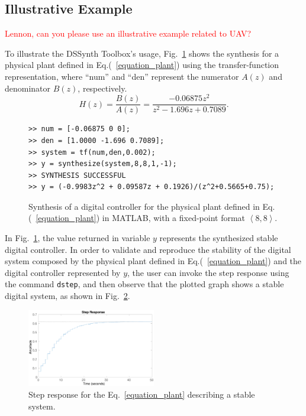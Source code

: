 \documentclass[sigconf]{acmart}
\newcommand\tool{{DSSynth Toolbox}\xspace}
\begin{document}
\subsection{Illustrative Example}

\textcolor{red}{Lennon, can you please use an illustrative example related to UAV?}

To illustrate the \tool's usage, Fig.~\ref{toolbox-usage} shows the 
synthesis for a physical plant defined in Eq.(~\ref{equation_plant}) 
using the transfer-function representation, where ``num'' and ``den'' 
represent the numerator $A(z)$ and denominator $B(z)$, respectively.
%
\begin{equation}
\label{equation_plant}
H(z)=\frac{B(z)}{A(z)}=\frac{-0.06875z^{2}}{z^2-1.696z+0.7089}.
\end{equation}
%
\begin{figure}[ht]
\scriptsize
\begin{lstlisting}[xleftmargin=.025\textwidth,xrightmargin=.025\textwidth, frame=single,]
>> num = [-0.06875 0 0];
>> den = [1.0000 -1.696 0.7089];
>> system = tf(num,den,0.002);
>> y = synthesize(system,8,8,1,-1);
>> SYNTHESIS SUCCESSFUL
>> y = (-0.9983z^2 + 0.09587z + 0.1926)/(z^2+0.5665+0.75);
\end{lstlisting}
\vspace{-0.2cm}
\caption{Synthesis of a digital controller for the physical plant defined in Eq.(~\ref{equation_plant}) in MATLAB, with a fixed-point format  $\left\langle 8,8\right\rangle$.}
\label{toolbox-usage}
\end{figure}
%
In Fig.~\ref{toolbox-usage}, the value returned in variable $y$ represents 
the synthesized stable digital controller. In order to validate and reproduce 
the stability of the digital system composed by the physical plant defined in Eq.(~\ref{equation_plant}) 
and the digital controller represented by $y$, the user can invoke the step response using the 
command \texttt{dstep}, and then observe that the plotted graph shows a stable digital system, 
as shown in Fig.~\ref{step-response}.
%
\begin{figure}[ht]
  \includegraphics[width=0.5\textwidth]{step-response.eps}
  \caption{Step response for the Eq.~\eqref{equation_plant} describing a stable system.}
  \label{step-response}
\end{figure}
\end{document}
